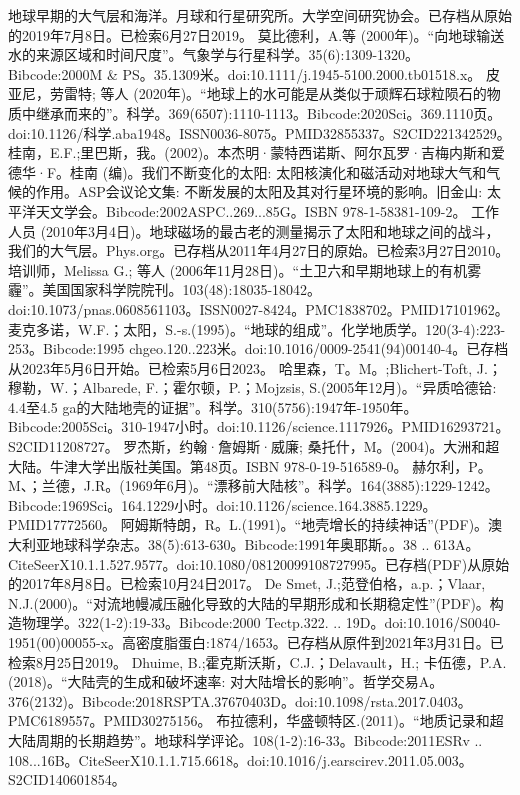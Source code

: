 \begin{enumerate}
 地球早期的大气层和海洋。月球和行星研究所。大学空间研究协会。已存档从原始的2019年7月8日。已检索6月27日2019。
 莫比德利，A.等 (2000年)。“向地球输送水的来源区域和时间尺度”。气象学与行星科学。35(6):1309-1320。Bibcode:2000M & PS。35.1309米。doi:10.1111/j.1945-5100.2000.tb01518.x。
 皮亚尼，劳雷特; 等人 (2020年)。“地球上的水可能是从类似于顽辉石球粒陨石的物质中继承而来的”。科学。369(6507):1110-1113。Bibcode:2020Sci。369.1110页。doi:10.1126/科学.aba1948。ISSN0036-8075。PMID32855337。S2CID221342529。   
 桂南，E.F.;里巴斯，我。(2002)。本杰明·蒙特西诺斯、阿尔瓦罗·吉梅内斯和爱德华·F。桂南 (编)。我们不断变化的太阳: 太阳核演化和磁活动对地球大气和气候的作用。ASP会议论文集: 不断发展的太阳及其对行星环境的影响。旧金山: 太平洋天文学会。Bibcode:2002ASPC..269...85G。ISBN 978-1-58381-109-2。
 工作人员 (2010年3月4日)。地球磁场的最古老的测量揭示了太阳和地球之间的战斗，我们的大气层。Phys.org。已存档从2011年4月27日的原始。已检索3月27日2010。
 培训师，Melissa G.; 等人 (2006年11月28日)。“土卫六和早期地球上的有机雾霾”。美国国家科学院院刊。103(48):18035-18042。doi:10.1073/pnas.0608561103。ISSN0027-8424。PMC1838702。PMID17101962。   
 麦克多诺，W.F.；太阳，S.-s.(1995)。“地球的组成”。化学地质学。120(3-4):223-253。Bibcode:1995 chgeo.120..223米。doi:10.1016/0009-2541(94)00140-4。已存档从2023年5月6日开始。已检索5月6日2023。
 哈里森，T。M。;Blichert-Toft, J.；穆勒，W.；Albarede, F.；霍尔顿，P.；Mojzsis, S.(2005年12月)。“异质哈德铪: 4.4至4.5 ga的大陆地壳的证据”。科学。310(5756):1947年-1950年。Bibcode:2005Sci。310-1947小时。doi:10.1126/science.1117926。PMID16293721。S2CID11208727。  
 罗杰斯，约翰·詹姆斯·威廉; 桑托什，M。(2004)。大洲和超大陆。牛津大学出版社美国。第48页。ISBN 978-0-19-516589-0。
 赫尔利，P。M、；兰德，J.R。(1969年6月)。“漂移前大陆核”。科学。164(3885):1229-1242。Bibcode:1969Sci。164.1229小时。doi:10.1126/science.164.3885.1229。PMID17772560。 
 阿姆斯特朗，R。L.(1991)。“地壳增长的持续神话”(PDF)。澳大利亚地球科学杂志。38(5):613-630。Bibcode:1991年奥耶斯。。38 .. 613A。CiteSeerX10.1.1.527.9577。doi:10.1080/08120099108727995。已存档(PDF)从原始的2017年8月8日。已检索10月24日2017。  
 De Smet, J.;范登伯格，a.p.；Vlaar, N.J.(2000)。“对流地幔减压融化导致的大陆的早期形成和长期稳定性”(PDF)。构造物理学。322(1-2):19-33。Bibcode:2000 Tectp.322. .. 19D。doi:10.1016/S0040-1951(00)00055-x。高密度脂蛋白:1874/1653。已存档从原件到2021年3月31日。已检索8月25日2019。
 Dhuime, B.;霍克斯沃斯，C.J.；Delavault，H.; 卡伍德，P.A.(2018)。“大陆壳的生成和破坏速率: 对大陆增长的影响”。哲学交易A。376(2132)。Bibcode:2018RSPTA.37670403D。doi:10.1098/rsta.2017.0403。PMC6189557。PMID30275156。  
 布拉德利，华盛顿特区.(2011)。“地质记录和超大陆周期的长期趋势”。地球科学评论。108(1-2):16-33。Bibcode:2011ESRv .. 108...16B。CiteSeerX10.1.1.715.6618。doi:10.1016/j.earscirev.2011.05.003。S2CID140601854。  

\end{enumerate}
